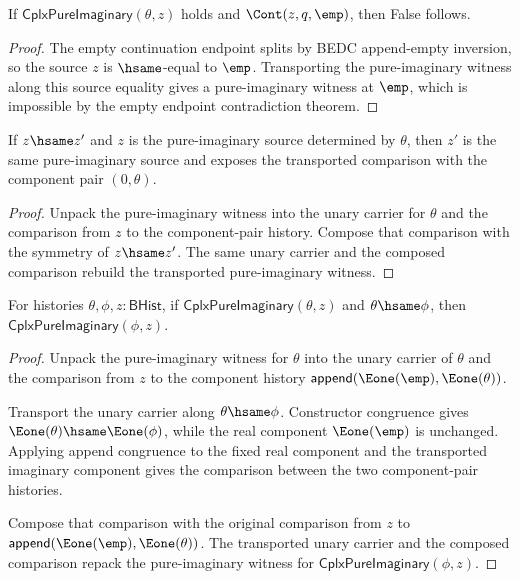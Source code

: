 \begin{theorem}
\label{thm:cplx-pure-imaginary-empty-continuation-absurd}
If $\mathsf{CplxPureImaginary}(\theta,z)$ holds and $\Cont(z,q,\emp)$, then
False follows.
\end{theorem}
\begin{proof}
The empty continuation endpoint splits by BEDC append-empty inversion, so the
source $z$ is $\hsame$-equal to $\emp$. Transporting the pure-imaginary witness
along this source equality gives a pure-imaginary witness at $\emp$, which is
impossible by the empty endpoint contradiction theorem.
\end{proof}

\begin{theorem}
\label{thm:cplx-pure-imaginary-hsame-transport}
If \(z\hsame z'\) and \(z\) is the pure-imaginary source determined by
\(\theta\), then \(z'\) is the same pure-imaginary source and exposes the
transported comparison with the component pair \((0,\theta)\).
\end{theorem}
\begin{proof}
Unpack the pure-imaginary witness into the unary carrier for \(\theta\) and
the comparison from \(z\) to the component-pair history. Compose that
comparison with the symmetry of \(z\hsame z'\). The same unary carrier and the
composed comparison rebuild the transported pure-imaginary witness.
\end{proof}

\begin{theorem}
\label{thm:cplx-pure-imaginary-phase-stability}
For histories $\theta,\phi,z:\mathsf{BHist}$, if
$\mathsf{CplxPureImaginary}(\theta,z)$ and $\theta\hsame\phi$, then
$\mathsf{CplxPureImaginary}(\phi,z)$.
\end{theorem}
\begin{proof}
Unpack the pure-imaginary witness for $\theta$ into the unary carrier of
$\theta$ and the comparison from $z$ to the component history
$\mathsf{append}(\Eone(\emp),\Eone(\theta))$.

Transport the unary carrier along $\theta\hsame\phi$. Constructor congruence
gives $\Eone(\theta)\hsame\Eone(\phi)$, while the real component
$\Eone(\emp)$ is unchanged. Applying append congruence to the fixed real
component and the transported imaginary component gives the comparison between
the two component-pair histories.

Compose that comparison with the original comparison from $z$ to
$\mathsf{append}(\Eone(\emp),\Eone(\theta))$. The transported unary carrier
and the composed comparison repack the pure-imaginary witness for
$\mathsf{CplxPureImaginary}(\phi,z)$.
\end{proof}


